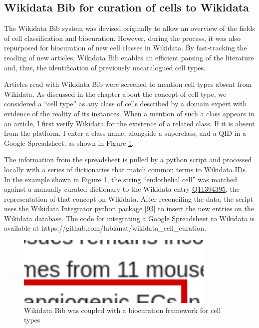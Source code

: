 \hypertarget{wikidata-bib-for-curation-of-cells-to-wikidata}{%
\subsection{Wikidata Bib for curation of cells to Wikidata}\label{wikidata-bib-for-curation-of-cells-to-wikidata}}

The Wikidata Bib system was devised originally to allow an overview of the fields of cell classification and biocuration.
However, during the process, it was also repurposed for biocuration of new cell classes in Wikidata.
By fast-tracking the reading of new articles, Wikidata Bib enables an efficient parsing of the literature and, thus, the identification of previously uncatalogued cell types.

Articles read with Wikidata Bib were screened to mention cell types absent from Wikidata.
As discussed in the chapter about the concept of cell type, we considered a ``cell type'' as any class of cells described by a domain expert with evidence of the reality of its instances.
When a mention of such a class appears in an article, I first verify Wikidata for the existence of a related class.
If it is absent from the platform, I enter a class name, alongside a superclass, and a QID in a Google Spreadsheet, as shown in Figure \ref{fig:biocuration_of_cells}.

The information from the spreadsheet is pulled by a python script and processed locally with a series of dictionaries that match common terms to Wikidata IDs.
In the example shown in Figure \ref{fig:biocuration_of_cells}, the string ``endothelial cell'' was matched against a manually curated dictionary to the Wikidata entry \href{https://www.wikidata.org/wiki/Q11394395}{Q11394395}, the representation of that concept on Wikidata.
After reconciling the data, the script uses the Wikidata Integrator python package {[}\protect\hyperlink{ref-qDI8I4IJ}{93}{]} to insert the new entries on the Wikidata database.
The code for integrating a Google Spreadsheet to Wikidata is available at https://github.com/lubianat/wikidata\_cell\_curation.

\begin{figure}
\hypertarget{fig:biocuration_of_cells}{%
\centering
\includegraphics[width=0.85\textwidth,height=\textheight]{images/biocuration_of_cells.png}
\caption{Wikidata Bib was coupled with a biocuration framework for cell types}\label{fig:biocuration_of_cells}
}
\end{figure}

